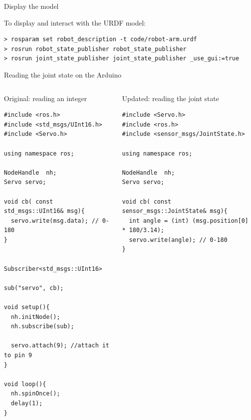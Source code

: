 \documentclass[compress]{beamer}
\begin{document}

\begin{frame}[fragile]{Display the model}

    To display and interact with the URDF model:

    \begin{verbatim}
> rosparam set robot_description -t code/robot-arm.urdf
> rosrun robot_state_publisher robot_state_publisher
> rosrun joint_state_publisher joint_state_publisher _use_gui:=true
\end{verbatim}
\end{frame}

\begin{frame}[fragile]{Reading the joint state on the Arduino}
\begin{columns}
    \begin{column}{0.5\linewidth}

\small Original: reading an integer
\begin{verbatim}
#include <ros.h>
#include <std_msgs/UInt16.h>
#include <Servo.h> 

using namespace ros;

NodeHandle  nh;
Servo servo;

void cb( const std_msgs::UInt16& msg){
  servo.write(msg.data); // 0-180
}


Subscriber<std_msgs::UInt16> 
                        sub("servo", cb);

void setup(){
  nh.initNode();
  nh.subscribe(sub);

  servo.attach(9); //attach it to pin 9
}

void loop(){
  nh.spinOnce();
  delay(1);
}
\end{verbatim}
    \end{column}
    \begin{column}{0.5\linewidth}

\small Updated: reading the joint state

\begin{verbatim}
#include <Servo.h> 
#include <ros.h>
#include <sensor_msgs/JointState.h>

using namespace ros;

NodeHandle  nh;
Servo servo;

void cb( const sensor_msgs::JointState& msg){
  int angle = (int) (msg.position[0] * 180/3.14);
  servo.write(angle); // 0-180
}


\end{verbatim}
\end{column}
\end{columns}
\end{frame}
\end{document}
